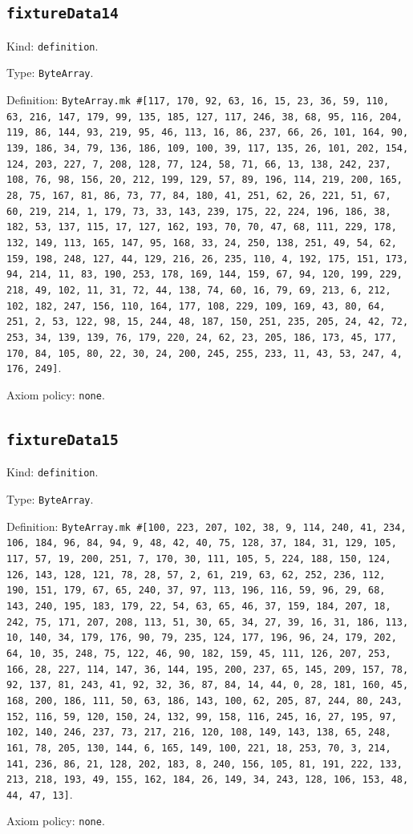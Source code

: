 \documentclass[11pt]{article}
\begin{document}
\subsection*{\texttt{fixtureData14}}
\noindent Kind: \texttt{definition}.\par
\noindent Type: \texttt{ByteArray}.\par
\noindent Definition: \texttt{ByteArray.mk \#[117, 170, 92, 63, 16, 15, 23, 36, 59, 110, 63, 216, 147, 179, 99, 135, 185, 127, 117, 246, 38, 68, 95, 116, 204, 119, 86, 144, 93, 219, 95, 46, 113, 16, 86, 237, 66, 26, 101, 164, 90, 139, 186, 34, 79, 136, 186, 109, 100, 39, 117, 135, 26, 101, 202, 154, 124, 203, 227, 7, 208, 128, 77, 124, 58, 71, 66, 13, 138, 242, 237, 108, 76, 98, 156, 20, 212, 199, 129, 57, 89, 196, 114, 219, 200, 165, 28, 75, 167, 81, 86, 73, 77, 84, 180, 41, 251, 62, 26, 221, 51, 67, 60, 219, 214, 1, 179, 73, 33, 143, 239, 175, 22, 224, 196, 186, 38, 182, 53, 137, 115, 17, 127, 162, 193, 70, 70, 47, 68, 111, 229, 178, 132, 149, 113, 165, 147, 95, 168, 33, 24, 250, 138, 251, 49, 54, 62, 159, 198, 248, 127, 44, 129, 216, 26, 235, 110, 4, 192, 175, 151, 173, 94, 214, 11, 83, 190, 253, 178, 169, 144, 159, 67, 94, 120, 199, 229, 218, 49, 102, 11, 31, 72, 44, 138, 74, 60, 16, 79, 69, 213, 6, 212, 102, 182, 247, 156, 110, 164, 177, 108, 229, 109, 169, 43, 80, 64, 251, 2, 53, 122, 98, 15, 244, 48, 187, 150, 251, 235, 205, 24, 42, 72, 253, 34, 139, 139, 76, 179, 220, 24, 62, 23, 205, 186, 173, 45, 177, 170, 84, 105, 80, 22, 30, 24, 200, 245, 255, 233, 11, 43, 53, 247, 4, 176, 249]}.\par
\noindent Axiom policy: \texttt{none}.\par
\subsection*{\texttt{fixtureData15}}
\noindent Kind: \texttt{definition}.\par
\noindent Type: \texttt{ByteArray}.\par
\noindent Definition: \texttt{ByteArray.mk \#[100, 223, 207, 102, 38, 9, 114, 240, 41, 234, 106, 184, 96, 84, 94, 9, 48, 42, 40, 75, 128, 37, 184, 31, 129, 105, 117, 57, 19, 200, 251, 7, 170, 30, 111, 105, 5, 224, 188, 150, 124, 126, 143, 128, 121, 78, 28, 57, 2, 61, 219, 63, 62, 252, 236, 112, 190, 151, 179, 67, 65, 240, 37, 97, 113, 196, 116, 59, 96, 29, 68, 143, 240, 195, 183, 179, 22, 54, 63, 65, 46, 37, 159, 184, 207, 18, 242, 75, 171, 207, 208, 113, 51, 30, 65, 34, 27, 39, 16, 31, 186, 113, 10, 140, 34, 179, 176, 90, 79, 235, 124, 177, 196, 96, 24, 179, 202, 64, 10, 35, 248, 75, 122, 46, 90, 182, 159, 45, 111, 126, 207, 253, 166, 28, 227, 114, 147, 36, 144, 195, 200, 237, 65, 145, 209, 157, 78, 92, 137, 81, 243, 41, 92, 32, 36, 87, 84, 14, 44, 0, 28, 181, 160, 45, 168, 200, 186, 111, 50, 63, 186, 143, 100, 62, 205, 87, 244, 80, 243, 152, 116, 59, 120, 150, 24, 132, 99, 158, 116, 245, 16, 27, 195, 97, 102, 140, 246, 237, 73, 217, 216, 120, 108, 149, 143, 138, 65, 248, 161, 78, 205, 130, 144, 6, 165, 149, 100, 221, 18, 253, 70, 3, 214, 141, 236, 86, 21, 128, 202, 183, 8, 240, 156, 105, 81, 191, 222, 133, 213, 218, 193, 49, 155, 162, 184, 26, 149, 34, 243, 128, 106, 153, 48, 44, 47, 13]}.\par
\noindent Axiom policy: \texttt{none}.\par
\end{document}
